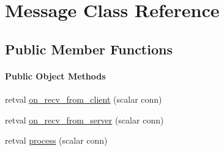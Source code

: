 \hypertarget{class_d_jabberd_1_1_message}{
\section{\-Message \-Class \-Reference}
\label{class_d_jabberd_1_1_message}
}
\subsection*{\-Public \-Member \-Functions}
\begin{Indent}\paragraph*{\-Public \-Object \-Methods}
\begin{DoxyCompactItemize}
\item 
retval \hyperlink{class_d_jabberd_1_1_message_ae63682df867d9a59ae7096b94a14aeef}{on\-\_\-recv\-\_\-from\-\_\-client} (scalar conn)
\item 
retval \hyperlink{class_d_jabberd_1_1_message_ad3c4c11657fd6d051400183115faade3}{on\-\_\-recv\-\_\-from\-\_\-server} (scalar conn)
\item 
retval \hyperlink{class_d_jabberd_1_1_message_ab7f1ec7c252b6da66a3a6e2e64655647}{process} (scalar conn)
\end{DoxyCompactItemize}
\end{Indent}


